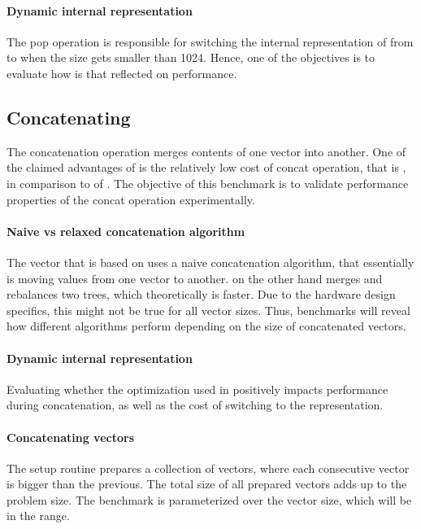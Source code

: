 \paragraph*{Dynamic internal representation}
The pop operation is responsible for switching the internal representation of \pvec{} from \rrbvec{} to \stdvec{} when the size gets smaller than 1024. Hence, one of the objectives is to evaluate how is that reflected on performance. 

\subsection{Concatenating}
The concatenation operation merges contents of one vector into another. One of the claimed advantages of \rrbtree{} is the relatively low cost of concat operation, that is , in comparison to  of \stdvec{}. The objective of this benchmark is to validate performance properties of the concat operation experimentally. 

\paragraph*{Naive vs relaxed concatenation algorithm}
The vector that is based on \rbtree{} uses a naive concatenation algorithm, that essentially is moving values from one vector to another. \rrbtree{} on the other hand merges and rebalances two trees, which theoretically is faster. Due to the hardware design specifics, this might not be true for all vector sizes. Thus, benchmarks will reveal how different algorithms perform depending on the size of concatenated vectors. 

\paragraph*{Dynamic internal representation}
Evaluating whether the \stdvec{} optimization used in \pvec{} positively impacts performance during concatenation, as well as the cost of switching to the \rrbvec{} representation. 

\paragraph*{Concatenating vectors}
The setup routine prepares a collection of vectors, where each consecutive vector is bigger than the previous. The total size of all prepared vectors adds up to the problem size. The benchmark is parameterized over the vector size, which will be in the \range{[10, 1m]} range. 

